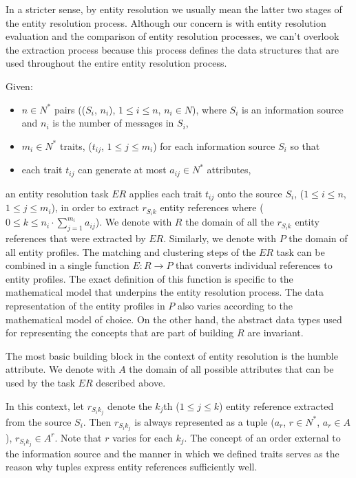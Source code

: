 \documentclass[11pt]{article}
\begin{document}
    In a stricter sense, by entity resolution we usually mean the latter two
    stages of the entity resolution process.
    Although our concern is with entity resolution evaluation and the comparison
    of entity resolution processes, we can't overlook the extraction process
    because this process defines the data structures that are used throughout
    the entire entity resolution process.

    Given:
    \begin{itemize}
        \item $n \in N^*$ pairs (($S_i$, $n_i$), $1 \leq i \leq n$, $n_i \in N$), 
        where $S_i$ is an information source and $n_i$ is the number of messages
        in $S_i$,
        \item $m_i \in N^*$ traits, ($t_{ij}$, $1 \leq j \leq m_i$) for each
        information source $S_i$ so that
        \item each trait $t_{ij}$ can generate at most $a_{ij} \in N^*$
        attributes,
    \end{itemize}
    an entity resolution task $ER$ applies each trait $t_{ij}$ onto the source
    $S_i$, ($1 \leq i \leq n$, $1 \leq j \leq m_i$), in order to extract
    $r_{{S_i}k}$ entity references where
    ($0 \leq k \leq n_i \cdot \sum^{m_i}_{j=1}a_{ij}$).
    We denote with $R$ the domain of all the $r_{{S_i}k}$ entity references that
    were extracted by $ER$.
    Similarly, we denote with $P$ the domain of all entity profiles.
    The matching and clustering steps of the $ER$ task can be combined in a
    single function $E: R \rightarrow P$ that converts individual references to
    entity profiles.
    The exact definition of this function is specific to the mathematical model
    that underpins the entity resolution process.
    The data representation of the entity profiles in $P$ also varies according
    to the mathematical model of choice.
    On the other hand, the abstract data types used for representing the
    concepts that are part of building $R$ are invariant.

    The most basic building block in the context of entity resolution is the
    humble attribute.
    We denote with $A$ the domain of all possible attributes that can be used by
    the task $ER$ described above.

    In this context, let $r_{{S_i}{k_j}}$ denote the $k_j$th ($1 \leq j \leq k$)
    entity reference extracted from the source $S_i$.
    Then $r_{{S_i}{k_j}}$ is always represented as a tuple
    ($a_r$, $r \in N^*$, $a_r \in A$), $r_{{S_i}{k_j}} \in A^r$.
    Note that $r$ varies for each $k_j$.
    The concept of an order external to the information source and the manner in
    which we defined traits serves as the reason why tuples express entity
    references sufficiently well.
\end{document}
